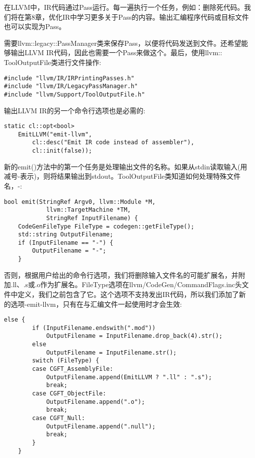 在LLVM中，IR代码通过Pass运行。每一遍执行一个任务，例如：删除死代码。我们将在第8章，优化IR中学习更多关于Pass的内容。输出汇编程序代码或目标文件也可以实现为Pass。\par

需要llvm::legacy::PassManager类来保存Pass，以便将代码发送到文件。还希望能够输出LLVM IR代码，因此也需要一个Pass来做这个。最后，使用llvm:: ToolOutputFile类进行文件操作:\par

\begin{lstlisting}[caption={}]
#include "llvm/IR/IRPrintingPasses.h"
#include "llvm/IR/LegacyPassManager.h"
#include "llvm/Support/ToolOutputFile.h"
\end{lstlisting}

输出LLVM IR的另一个命令行选项也是必需的:\par

\begin{lstlisting}[caption={}]
static cl::opt<bool>
	EmitLLVM("emit-llvm",
		cl::desc("Emit IR code instead of assembler"),
		cl::init(false));
\end{lstlisting}

新的emit()方法中的第一个任务是处理输出文件的名称。如果从stdin读取输入(用减号-表示)，则将结果输出到stdout。ToolOutputFile类知道如何处理特殊文件名，-:\par

\begin{lstlisting}[caption={}]
bool emit(StringRef Argv0, llvm::Module *M,
			llvm::TargetMachine *TM,
			StringRef InputFilename) {
	CodeGenFileType FileType = codegen::getFileType();
	std::string OutputFilename;
	if (InputFilename == "-") {
		OutputFilename = "-";
	}
\end{lstlisting}

否则，根据用户给出的命令行选项，我们将删除输入文件名的可能扩展名，并附加.ll、.s或.o作为扩展名。FileType选项在llvm/CodeGen/CommandFlags.inc头文件中定义，我们之前包含了它。这个选项不支持发出IR代码，所以我们添加了新的选项-emit-llvm，只有在与汇编文件一起使用时才会生效:\par

\begin{lstlisting}[caption={}]
	else {
		if (InputFilename.endswith(".mod"))
			OutputFilename = InputFilename.drop_back(4).str();
		else
			OutputFilename = InputFilename.str();
		switch (FileType) {
		case CGFT_AssemblyFile:
			OutputFilename.append(EmitLLVM ? ".ll" : ".s");
			break;
		case CGFT_ObjectFile:
			OutputFilename.append(".o");
			break;
		case CGFT_Null:
			OutputFilename.append(".null");
			break;
		}
	}
\end{lstlisting}

